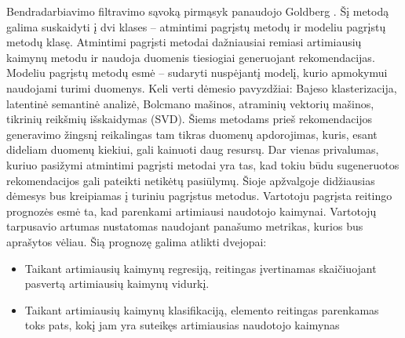 \documentclass{VUMIFInfMagistrinis}
\begin{document}
Bendradarbiavimo filtravimo sąvoką pirmąsyk panaudojo Goldberg \cite{16}. Šį metodą  galima suskaidyti į dvi klases – atmintimi pagrįstų metodų ir modeliu pagrįstų metodų klasę. Atmintimi pagrįsti metodai dažniausiai remiasi  artimiausių kaimynų metodu ir naudoja duomenis tiesiogiai generuojant rekomendacijas. Modeliu pagrįstų metodų esmė – sudaryti nuspėjantį modelį, kurio apmokymui naudojami turimi duomenys. Keli verti dėmesio pavyzdžiai: Bajeso klasterizacija, latentinė semantinė analizė, Bolcmano mašinos, atraminių vektorių mašinos, tikrinių reikšmių išskaidymas (SVD). Šiems metodams prieš rekomendacijos generavimo žingsnį reikalingas tam tikras duomenų apdorojimas, kuris, esant dideliam duomenų kiekiui, gali kainuoti daug resursų. Dar vienas privalumas, kuriuo pasižymi atmintimi pagrįsti metodai yra tas,  kad tokiu būdu sugeneruotos rekomendacijos gali pateikti netikėtų pasiūlymų. Šioje apžvalgoje didžiausias dėmesys bus kreipiamas į turiniu pagrįstus metodus.
\newline
\indent
	Vartotoju pagrįsta reitingo prognozės esmė ta, kad parenkami artimiausi naudotojo kaimynai. Vartotojų tarpusavio artumas nustatomas naudojant panašumo metrikas, kurios bus aprašytos vėliau. Šią prognozę galima atlikti dvejopai:
	\begin{itemize}
		\item Taikant artimiausių kaimynų regresiją, reitingas įvertinamas skaičiuojant pasvertą artimiausių kaimynų vidurkį.
		\item Taikant artimiausių kaimynų klasifikaciją, elemento reitingas parenkamas toks pats, kokį jam yra suteikęs artimiausias naudotojo kaimynas
	\end{itemize}
\end{document}
